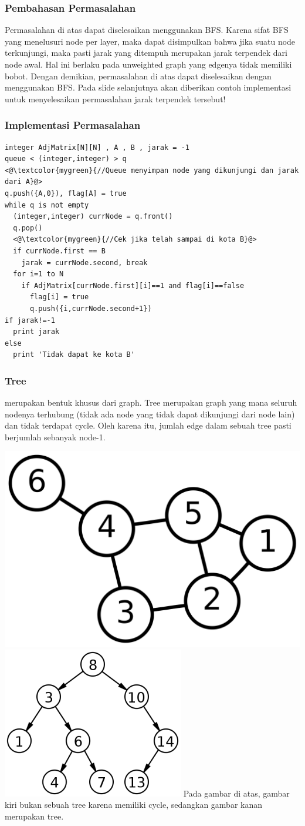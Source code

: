 \begin{frame}
\frametitle{Pembahasan Permasalahan}
Permasalahan di atas dapat diselesaikan menggunakan BFS. Karena sifat BFS yang menelusuri node per layer, maka dapat disimpulkan bahwa jika suatu node terkunjungi, maka pasti jarak yang ditempuh merupakan jarak terpendek dari node awal. Hal ini berlaku pada unweighted graph yang edgenya tidak memiliki bobot.
\newline\newline
Dengan demikian, permasalahan di atas dapat diselesaikan dengan menggunakan BFS. Pada slide selanjutnya akan diberikan contoh implementasi untuk menyelesaikan permasalahan jarak terpendek tersebut!
\end{frame}

\begin{frame}[fragile]
\frametitle{Implementasi Permasalahan}

\begin{lstlisting}
integer AdjMatrix[N][N] , A , B , jarak = -1
queue < (integer,integer) > q
<@\textcolor{mygreen}{//Queue menyimpan node yang dikunjungi dan jarak dari A}@>
q.push({A,0}), flag[A] = true
while q is not empty
  (integer,integer) currNode = q.front()
  q.pop()
  <@\textcolor{mygreen}{//Cek jika telah sampai di kota B}@>
  if currNode.first == B
    jarak = currNode.second, break
  for i=1 to N
    if AdjMatrix[currNode.first][i]==1 and flag[i]==false
      flag[i] = true
      q.push({i,currNode.second+1})
if jarak!=-1
  print jarak
else
  print 'Tidak dapat ke kota B'    
\end{lstlisting}
\end{frame}

\begin{frame}
\frametitle{Tree}
 merupakan bentuk khusus dari graph. Tree merupakan graph yang mana seluruh nodenya terhubung (tidak ada node yang tidak dapat dikunjungi dari node lain) dan tidak terdapat cycle. Oleh karena itu, jumlah edge dalam sebuah tree pasti berjumlah sebanyak node-1.

\includegraphics[width=4 cm]{asset/not-tree.png}
\hspace{\fill}
\includegraphics[width=4 cm]{asset/tree.png}
\newline\newline
Pada gambar di atas, gambar kiri bukan sebuah tree karena memiliki cycle, sedangkan gambar kanan merupakan tree. 
\end{frame}

